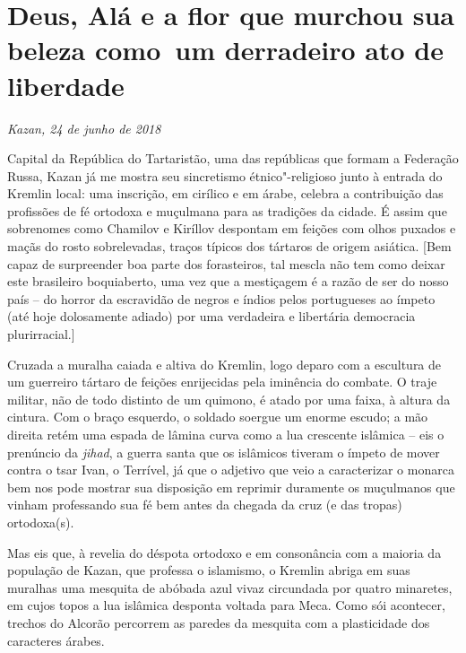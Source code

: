 \chapter*{Deus, Alá e a flor que murchou sua beleza como~um derradeiro ato de liberdade}
\@openrighttrue\makeatother

\begin{flushright}
\emph{Kazan, 24 de junho de 2018}
\end{flushright}

Capital da República do Tartaristão, uma das repúblicas que formam a
Federação Russa, Kazan já me mostra seu sincretismo étnico"-religioso
junto à entrada do Kremlin local: uma inscrição, em cirílico e em árabe,
celebra a contribuição das profissões de fé ortodoxa e muçulmana para as
tradições da cidade. É assim que sobrenomes como Chamilov e Kiríllov
despontam em feições com olhos puxados e maçãs do rosto sobrelevadas,
traços típicos dos tártaros de origem asiática. {[}Bem capaz de
surpreender boa parte dos forasteiros, tal mescla não tem como deixar
este brasileiro boquiaberto, uma vez que a mestiçagem é a razão de ser
do nosso país -- do horror da escravidão de negros e índios pelos
portugueses ao ímpeto (até hoje dolosamente adiado) por uma verdadeira e
libertária democracia plurirracial.{]}

Cruzada a muralha caiada e altiva do Kremlin, logo deparo com a
escultura de um guerreiro tártaro de feições enrijecidas pela iminência
do combate. O traje militar, não de todo distinto de um quimono, é atado
por uma faixa, à altura da cintura. Com o braço esquerdo, o soldado
soergue um enorme escudo; a mão direita retém uma espada de lâmina curva
como a lua crescente islâmica -- eis o prenúncio da \emph{jihad}, a
guerra santa que os islâmicos tiveram o ímpeto de mover contra o tsar
Ivan, o Terrível, já que o adjetivo que veio a caracterizar o monarca
bem nos pode mostrar sua disposição em reprimir duramente os muçulmanos
que vinham professando sua fé bem antes da chegada da cruz (e das
tropas) ortodoxa(s).

Mas eis que, à revelia do déspota ortodoxo e em consonância com a
maioria da população de Kazan, que professa o islamismo, o Kremlin
abriga em suas muralhas uma mesquita de abóbada azul vivaz circundada
por quatro minaretes, em cujos topos a lua islâmica desponta voltada
para Meca. Como sói acontecer, trechos do Alcorão percorrem as paredes
da mesquita com a plasticidade dos caracteres árabes.

